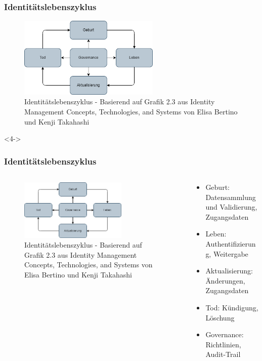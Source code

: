 \documentclass[11pt]{beamer}
\begin{document}
\begin{frame}
  \frametitle{Identitätslebenszyklus}
  \begin{figure}[H]
    \centering
    \includegraphics[width=0.6\textwidth]{assets/idlc.png}
    \caption{Identitätslebenszyklus - Basierend auf Grafik 2.3 aus \glqq{}Identity Management Concepts, Technologies, and Systems\grqq{} von Elisa Bertino und Kenji Takahashi}\label{fig:idlc}
  \end{figure}
\end{frame}

\begin{frame}<4->
  \frametitle{Identitätslebenszyklus}
  \begin{columns}
    \begin{column}{0.55\textwidth}
      \begin{figure}[H]
        \centering
        \includegraphics[width=0.7\textwidth]{assets/idlc.png}
        \caption{Identitätslebenszyklus - Basierend auf Grafik 2.3 aus \glqq{}Identity Management Concepts, Technologies, and Systems\grqq{} von Elisa Bertino und Kenji Takahashi}\label{fig:idlc}
      \end{figure}
    \end{column}
    \begin{column}{0.45\textwidth}
      \begin{itemize}
        \item Geburt: Datensammlung und Validierung, Zugangsdaten
        \item Leben: Authentifizierung, Weitergabe
        \item Aktualisierung: Änderungen, Zugangsdaten
        \item Tod: Kündigung, Löschung
        \item Governance: Richtlinien, Audit-Trail~
      \end{itemize}
    \end{column}
  \end{columns}
\end{frame}
\end{document}
